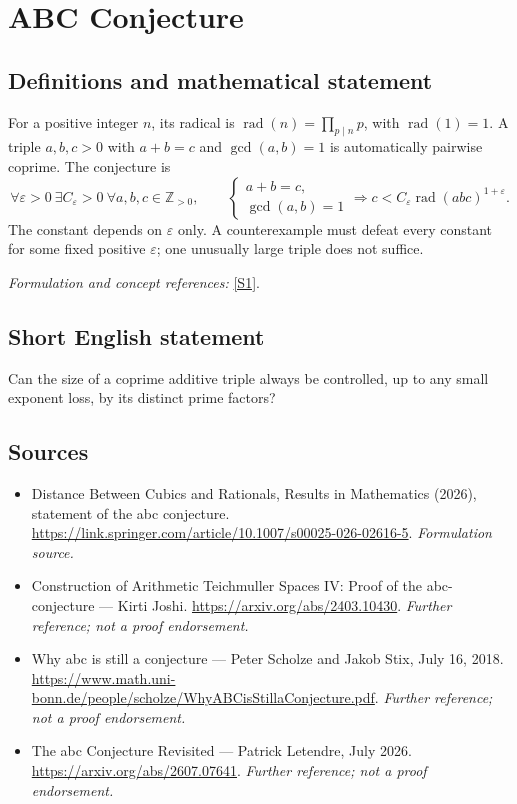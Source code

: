 \documentclass[11pt]{article}
\begin{document}
\section*{\texorpdfstring{ABC Conjecture}{ABC Conjecture}}\label{statement}
\subsection{Definitions and mathematical statement}
For a positive integer $n$, its radical is $\operatorname{rad}(n)=\prod_{p\mid n}p$, with $\operatorname{rad}(1)=1$. A triple $a,b,c>0$ with $a+b=c$ and $\gcd(a,b)=1$ is automatically pairwise coprime. The conjecture is
\[
 \forall\varepsilon>0\ \exists C_\varepsilon>0\ \forall a,b,c\in{\mathbb{Z}}_{>0},\qquad
 \begin{cases}a+b=c,\\\gcd(a,b)=1\end{cases}
 \Longrightarrow c<C_\varepsilon\operatorname{rad}(abc)^{1+\varepsilon}.
\]
The constant depends on $\varepsilon$ only. A counterexample must defeat every constant for some fixed positive $\varepsilon$; one unusually large triple does not suffice.
\par\smallskip\textit{Formulation and concept references:} \href{https://link.springer.com/article/10.1007/s00025-026-02616-5}{[S1]}.

\subsection{Short English statement}
Can the size of a coprime additive triple always be controlled, up to any small exponent loss, by its distinct prime factors?
\subsection{Sources}
\begin{itemize}
\item[S1]Distance Between Cubics and Rationals, Results in Mathematics (2026), statement of the abc conjecture.
\url{https://link.springer.com/article/10.1007/s00025-026-02616-5}.
\textit{Formulation source.}
\item[S2]Construction of Arithmetic Teichmuller Spaces IV: Proof of the abc-conjecture — Kirti Joshi.
\url{https://arxiv.org/abs/2403.10430}.
\textit{Further reference; not a proof endorsement.}
\item[S3]Why abc is still a conjecture — Peter Scholze and Jakob Stix, July 16, 2018.
\url{https://www.math.uni-bonn.de/people/scholze/WhyABCisStillaConjecture.pdf}.
\textit{Further reference; not a proof endorsement.}
\item[S4]The abc Conjecture Revisited — Patrick Letendre, July 2026.
\url{https://arxiv.org/abs/2607.07641}.
\textit{Further reference; not a proof endorsement.}
\end{itemize}
\end{document}
